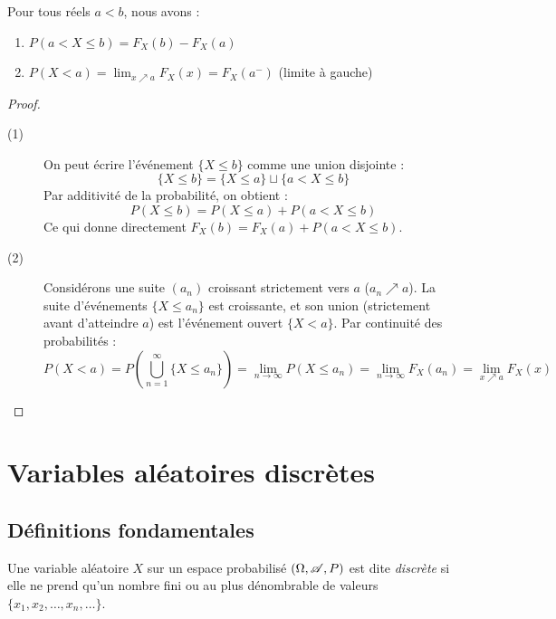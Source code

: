 \newpage

\begin{proposition}
    Pour tous réels $a < b$, nous avons :
    \begin{enumerate}
        \item $P(a < X \leq b) = F_X(b) - F_X(a)$
        \item $P(X < a) = \displaystyle\lim_{x \nearrow a} F_X(x) = F_X(a^-)$ (limite à gauche)
    \end{enumerate}
\end{proposition}

\begin{proof}
    \begin{description}
        \item[(1)] On peut écrire l'événement $\{X \leq b\}$ comme une union disjointe :
        \[
        \{X \leq b\} = \{X \leq a\} \sqcup \{a < X \leq b\}
        \]
        Par additivité de la probabilité, on obtient :
        \[
        P(X \leq b) = P(X \leq a) + P(a < X \leq b)
        \]
        Ce qui donne directement $F_X(b) = F_X(a) + P(a < X \leq b)$.
        
        \item[(2)] Considérons une suite $(a_n)$ croissant strictement vers $a$ ($a_n \nearrow a$). La suite d'événements $\{X \leq a_n\}$ est croissante, et son union (strictement avant d'atteindre $a$) est l'événement ouvert $\{X < a\}$. Par continuité des probabilités :
        \[
        P(X < a) = P\left(\bigcup_{n=1}^\infty \{X \leq a_n\}\right) = \lim_{n\to \infty} P(X \leq a_n) = \lim_{n\to \infty} F_X(a_n) = \lim_{x \nearrow a} F_X(x)
        \]
    \end{description} 
\end{proof}

\section{Variables aléatoires discrètes}

\subsection{Définitions fondamentales}

\begin{definition}
    Une variable aléatoire $X$ sur un espace probabilisé $(\Omega, \mathscr{A}, P)$ est dite \emph{discrète} si elle ne prend qu'un nombre fini ou au plus dénombrable de valeurs $\{x_1, x_2, \dots, x_n, \dots\}$.
\end{definition}

